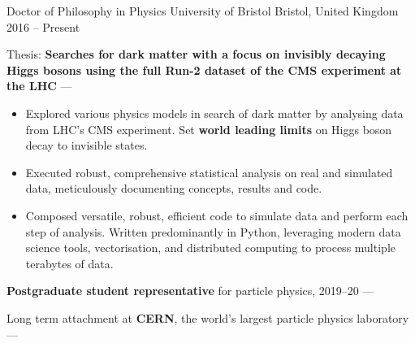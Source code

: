 
\newcommand{\vpaddingEduNorm}{\vspace{1mm}} %
\newcommand{\vpaddingEduSubpoint}{\vspace{0.75mm}} %


\begin{cventries}
    \cventry
        {Doctor of Philosophy in Physics} %
        {University of Bristol} %
        {Bristol, United Kingdom} %
        {2016 -- Present} %
        {
        \begin{cvitems} %
            \item {Thesis: \textbf{Searches for dark matter with a focus on invisibly decaying Higgs bosons using the full Run-2 dataset of the CMS experiment at the LHC} --- }
            \vpaddingEduSubpoint
            \begin{itemize}
                \item[\bullet]{Explored various physics models in search of dark matter by analysing data from LHC's CMS experiment. Set \textbf{world leading limits} on Higgs boson decay to invisible states.}
                \vpaddingEduSubpoint
                \item[\bullet]{Executed robust, comprehensive statistical analysis on real and simulated data, meticulously documenting concepts, results and code.}
                \vpaddingEduSubpoint
                \item[\bullet]{Composed versatile, robust, efficient code to simulate data and perform each step of analysis. Written predominantly in Python, leveraging modern data science tools, vectorisation, and distributed computing to process multiple terabytes of data.}
            \end{itemize}
            \vpaddingEduNorm
            \item {\textbf{Postgraduate student representative} for particle physics, 2019--20 --- }
            \vpaddingEduNorm
            \item {Long term attachment at \textbf{CERN}, the world's largest particle physics laboratory --- }

\end{cvitems}}
\end{cventries}
